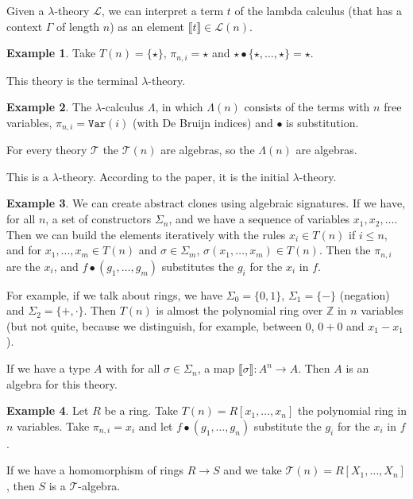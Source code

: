 \documentclass{amsart}
\theoremstyle{definition}
\newtheorem{example}{Example}
\begin{document}
  Given a $ \lambda $-theory $ \mathcal L $, we can interpret a term $ t $ of the lambda calculus (that has a context $ \Gamma $ of length $ n $) as an element $ \llbracket t \rrbracket \in \mathcal L(n) $.
  
  \begin{example}
    Take $ T(n) = \{ \star \} $, $ \pi_{n, i} = \star $ and $ \star \bullet \{ \star, \dots, \star \} = \star $.

    This theory is the terminal $ \lambda $-theory.
  \end{example}

  \begin{example}
    The $ \lambda $-calculus $ \Lambda $, in which $ \Lambda(n) $ consists of the terms with $ n $ free variables, $ \pi_{n, i} = \texttt{Var}(i) $ (with De Bruijn indices) and $ \bullet $ is substitution.

    For every theory $ \mathcal T $ the $ \mathcal T(n) $ are algebras, so the $ \Lambda(n) $ are algebras.

    This is a $ \lambda $-theory. According to the paper, it is the initial $ \lambda $-theory.
  \end{example}

  \begin{example}
    We can create abstract clones using algebraic signatures. If we have, for all $ n $, a set of constructors $ \Sigma_n $, and we have a sequence of variables $ x_1, x_2, \dots $. Then we can build the elements iteratively with the rules $ x_i \in T(n) $ if $ i \leq n $, and for $ x_1, \dots, x_m \in T(n) $ and $ \sigma \in \Sigma_m $, $ \sigma(x_1, \dots, x_m) \in T(n) $. Then the $ \pi_{n, i} $ are the $ x_i $, and $ f \bullet (g_1, \dots, g_m) $ substitutes the $ g_i $ for the $ x_i $ in $ f $.

    For example, if we talk about rings, we have $ \Sigma_0 = \{ 0, 1 \} $, $ \Sigma_1 = \{ - \} $ (negation) and $ \Sigma_2 = \{ +, \cdot \} $. Then $ T(n) $ is almost the polynomial ring over $ \mathbb Z $ in $ n $ variables (but not quite, because we distinguish, for example, between $ 0 $, $ 0 + 0 $ and $ x_1 - x_1 $).

    If we have a type $ A $ with for all $ \sigma \in \Sigma_n $, a map $ \llbracket \sigma \rrbracket : A^n \to A $. Then $ A $ is an algebra for this theory.
  \end{example}

  \begin{example}
    Let $ R $ be a ring. Take $ T(n) = R[x_1, \dots, x_n] $ the polynomial ring in $ n $ variables. Take $ \pi_{n, i} = x_i $ and let $ f \bullet (g_1, \dots, g_n) $ substitute the $ g_i $ for the $ x_i $ in $ f $.

    If we have a homomorphism of rings $ R \to S $ and we take $ \mathcal T(n) = R[X_1, \dots, X_n] $, then $ S $ is a $ \mathcal T $-algebra.
  \end{example}
\end{document}
